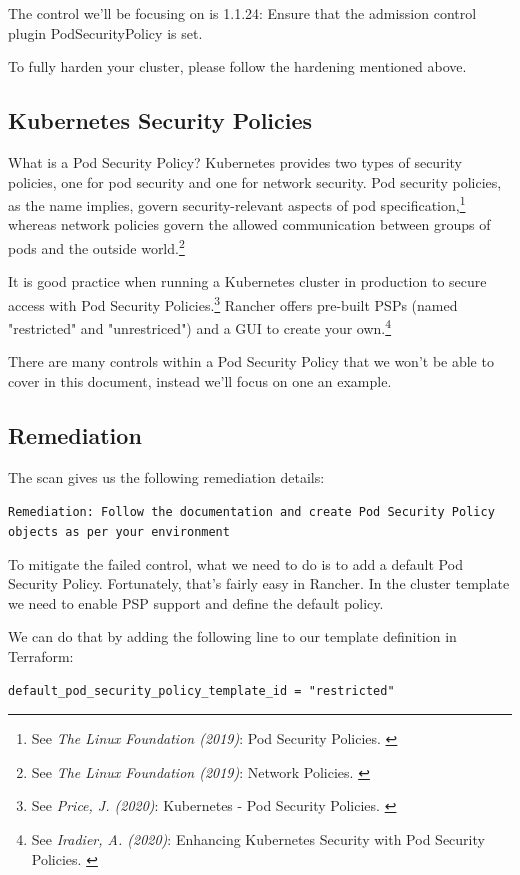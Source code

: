 The control we'll be focusing on is 1.1.24: Ensure that the admission control plugin PodSecurityPolicy is set.

To fully harden your cluster, please follow the hardening mentioned above.

\subsection{Kubernetes Security Policies}

What is a Pod Security Policy? Kubernetes provides two types of security policies, one for pod security and one for network security. Pod security policies, as the name implies, govern security-relevant aspects of pod specification,\footnote{See \textit{The Linux Foundation (2019)}: Pod Security Policies. \cite{podSecurity}} whereas network policies govern the allowed communication between groups of pods and the outside world.\footnote{See \textit{The Linux Foundation (2019)}: Network Policies. \cite{netSecurity}}

It is good practice when running a Kubernetes cluster in production to secure access with Pod Security Policies.\footnote{See \textit{Price, J. (2020)}: Kubernetes - Pod Security Policies. \cite{examplePsp}} Rancher offers pre-built PSPs (named "restricted" and "unrestriced") and a GUI to create your own.\footnote{See \textit{Iradier, A. (2020)}: Enhancing Kubernetes Security with Pod Security Policies. \cite{detailPsp}}

There are many controls within a Pod Security Policy that we won't be able to cover in this document, instead we'll focus on one an example.

\subsection{Remediation}

The scan gives us the following remediation details:

\verb|Remediation: Follow the documentation and create Pod Security Policy objects as per your environment|

To mitigate the failed control, what we need to do is to add a default Pod Security Policy. Fortunately, that's fairly easy in Rancher. In the cluster template we need to enable PSP support and define the default policy.

We can do that by adding the following line to our template definition in Terraform:

\begin{lstlisting}[caption=Cluster Template, frame=single, basicstyle=\ttfamily]
default_pod_security_policy_template_id = "restricted"
\end{lstlisting}


